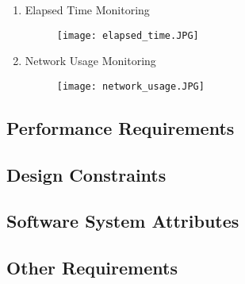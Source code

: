 \documentclass{article}
\begin{document}
\begin{enumerate}
\begin{enumerate}
                    \item{Elapsed Time Monitoring}
                    \begin{figure}[H]
                    	\centering
                        \texttt{[image: elapsed\_time.JPG]}
						\newline
                        \newline
                    \end{figure}
                    
                    \item{Network Usage Monitoring}
                    \begin{figure}[H]
                    	\centering
                        \texttt{[image: network\_usage.JPG]}
                        \newline
                        \newline
                    \end{figure}
                    
            	\end{enumerate}
        \end{enumerate}
	\subsection{Performance Requirements}
	\subsection{Design Constraints}
	\subsection{Software System Attributes}
	\subsection{Other Requirements}
\end{document}
